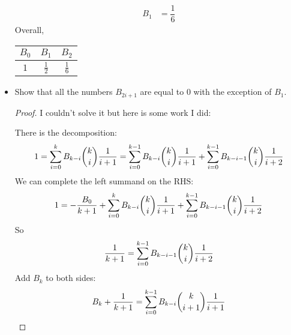 \documentclass{article}
\begin{document}
\begin{itemize}
\begin{answer}
\begin{align*}
                        B_{1}                               &= \dfrac{1}{6}   
                    \end{align*}
                Overall,
                    \begin{center}
                        \begin{tabular}{ c c c }
                            \hline $B_{0}$ & $B_{1}$       & $B_{2}$       \\
                            \hline $1$     & $\frac{1}{2}$ & $\frac{1}{6}$   
                        \end{tabular}
                    \end{center}
            \end{answer}

        \item Show that all the numbers $B_{2i + 1}$ are equal to $0$ with the exception of $B_{1}$. 
            \begin{proof}
                I couldn't solve it but here is some work I did: 

                There is the decomposition:
                    \begin{equation*}
                        1 = \sum_{i = 0}^{k}B_{k - i}\dbinom{k}{i}\dfrac{1}{i + 1} = \sum_{i = 0}^{k - 1}B_{k - i}\dbinom{k}{i}\dfrac{1}{i + 1} + \sum_{i = 0}^{k - 1}B_{k - i - 1}\dbinom{k}{i}\dfrac{1}{ i + 2}
                    \end{equation*}
                We can complete the left summand on the RHS:
                    \begin{equation*}
                        1 = - \dfrac{B_{0}}{k + 1} + \sum_{i = 0}^{k}B_{k - i}\dbinom{k}{i}\dfrac{1}{i + 1} + \sum_{i = 0}^{k - 1}B_{k - i - 1}\dbinom{k}{i}\dfrac{1}{ i + 2}
                    \end{equation*}
                So
                    \begin{equation*}
                        \dfrac{1}{k + 1} = \sum_{i = 0}^{k - 1}B_{k - i- 1} \dbinom{k}{i}\dfrac{1}{i + 2}
                    \end{equation*}
                Add $B_{k}$ to both sides:
                    \begin{equation*}
                        B_{k} + \dfrac{1}{k + 1} = \sum_{i = 0}^{k - 1}B_{k - i}\dbinom{k}{i + 1}\dfrac{1}{i + 1}
                    \end{equation*}
            \end{proof}
    \end{itemize}
\end{document}
